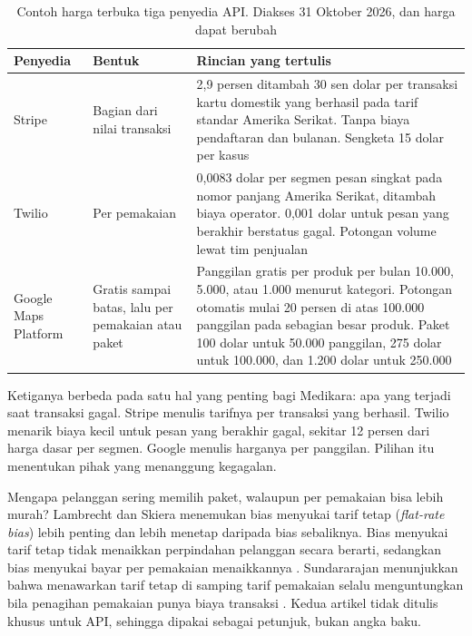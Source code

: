 \begin{table}[!htb]
  \centering
  \caption{Contoh harga terbuka tiga penyedia API. Diakses 31 Oktober 2026, dan harga dapat berubah}
  \label{tab:ch12-harga-publik}
  \footnotesize
  \begin{tabularx}{\textwidth}{H{2.1cm}H{2.5cm}G}
    \hline
    \textbf{Penyedia} & \textbf{Bentuk} & \textbf{Rincian yang tertulis} \\ \hline
    Stripe \cite{stripe-pricing} & Bagian dari nilai transaksi & 2,9 persen ditambah 30 sen dolar per transaksi kartu domestik yang berhasil pada tarif standar Amerika Serikat. Tanpa biaya pendaftaran dan bulanan. Sengketa 15 dolar per kasus \\ \hline
    Twilio \cite{c12-twilio-sms} & Per pemakaian & 0,0083 dolar per segmen pesan singkat pada nomor panjang Amerika Serikat, ditambah biaya operator. 0,001 dolar untuk pesan yang berakhir berstatus gagal. Potongan volume lewat tim penjualan \\ \hline
    Google Maps Platform \cite{c12-google-maps-pricing} & Gratis sampai batas, lalu per pemakaian atau paket & Panggilan gratis per produk per bulan 10.000, 5.000, atau 1.000 menurut kategori. Potongan otomatis mulai 20 persen di atas 100.000 panggilan pada sebagian besar produk. Paket 100 dolar untuk 50.000 panggilan, 275 dolar untuk 100.000, dan 1.200 dolar untuk 250.000 \\ \hline
  \end{tabularx}
\end{table}

Ketiganya berbeda pada satu hal yang penting bagi Medikara: apa yang terjadi saat transaksi gagal. Stripe menulis tarifnya per
transaksi yang berhasil. Twilio menarik biaya kecil untuk pesan yang berakhir gagal, sekitar 12 persen dari harga dasar per
segmen. Google menulis harganya per panggilan. Pilihan itu menentukan pihak yang menanggung kegagalan.

Mengapa pelanggan sering memilih paket, walaupun per pemakaian bisa lebih murah? Lambrecht dan Skiera menemukan bias menyukai
tarif tetap (\textit{flat-rate bias}) lebih penting dan lebih menetap daripada bias sebaliknya. Bias menyukai tarif tetap tidak
menaikkan perpindahan pelanggan secara berarti, sedangkan bias menyukai bayar per pemakaian menaikkannya
\cite{c12-lambrecht2006}. Sundararajan menunjukkan bahwa menawarkan tarif tetap di samping tarif pemakaian selalu menguntungkan
bila penagihan pemakaian punya biaya transaksi \cite{c12-sundararajan2004}. Kedua artikel tidak ditulis khusus untuk API, sehingga
dipakai sebagai petunjuk, bukan angka baku.

